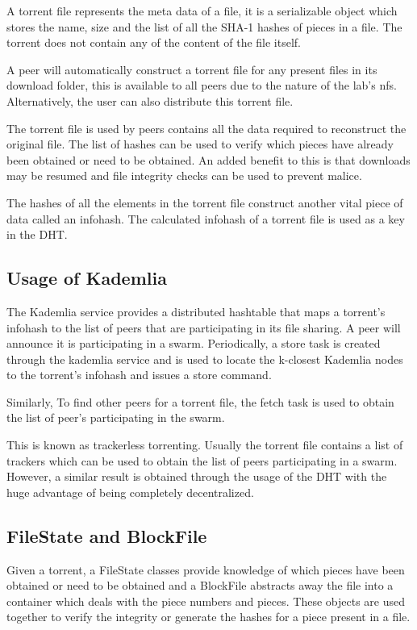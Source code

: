 \documentclass{article}
\begin{document}
A torrent file represents the meta data of a file, it is a serializable object which stores the name, size and the list of all the SHA-1 hashes of pieces in a file. The torrent does not contain any of the content of the file itself.

A peer will automatically construct a torrent file for any present files in its download folder, this is available to all peers due to the nature of the lab's nfs. Alternatively, the user can also distribute this torrent file.

The torrent file is used by peers contains all the data required to reconstruct the original file. The list of hashes can be used to verify which pieces have already been obtained or need to be obtained. An added benefit to this is that downloads may be resumed and file integrity checks can be used to prevent malice.

The hashes of all the elements in the torrent file construct another vital piece of data called an infohash. The calculated infohash of a torrent file is used as a key in the DHT.

\subsection{Usage of Kademlia}

The Kademlia service provides a distributed hashtable that maps a torrent's infohash to the list of peers that are participating in its file sharing. A peer will announce it is participating in a swarm. Periodically, a store task is created through the kademlia service and is used to locate the k-closest Kademlia nodes to the torrent's infohash and issues a store command.

Similarly, To find other peers for a torrent file, the fetch task is used to obtain the list of peer's participating in the swarm.

This is known as trackerless torrenting. Usually the torrent file contains a list of trackers which can be used to obtain the list of peers participating in a swarm. However, a similar result is obtained through the usage of the DHT with the huge advantage of being completely decentralized.  

\subsection{FileState and BlockFile}

Given a torrent, a FileState classes provide knowledge of which pieces have been obtained or need to be obtained and a BlockFile abstracts away the file into a container which deals with the piece numbers and pieces. These objects are used together to verify the integrity or generate the hashes for a piece present in a file.
\end{document}
